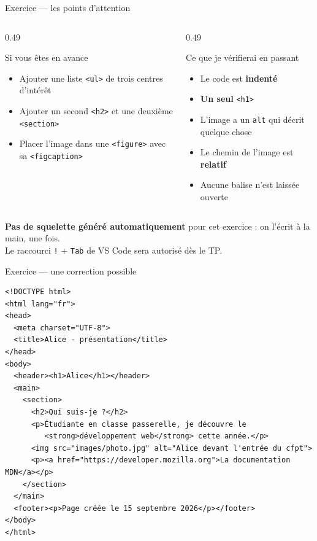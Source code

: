 \documentclass[aspectratio=169,11pt]{beamer}
\begin{document}
\begin{frame}{Exercice --- les points d'attention}
  \begin{columns}[T]
    \begin{column}{0.49\textwidth}
      \begin{exampleblock}{Si vous êtes en avance}
        \begin{itemize}
          \item Ajouter une liste \texttt{<ul>} de trois centres d'intérêt
          \item Ajouter un second \texttt{<h2>} et une deuxième \texttt{<section>}
          \item Placer l'image dans une \texttt{<figure>} avec sa \texttt{<figcaption>}
        \end{itemize}
      \end{exampleblock}
    \end{column}
    \begin{column}{0.49\textwidth}
      \begin{alertblock}{Ce que je vérifierai en passant}
        \begin{itemize}
          \item Le code est \textbf{indenté}
          \item \textbf{Un seul} \texttt{<h1>}
          \item L'image a un \texttt{alt} qui décrit quelque chose
          \item Le chemin de l'image est \textbf{relatif}
          \item Aucune balise n'est laissée ouverte
        \end{itemize}
      \end{alertblock}
    \end{column}
  \end{columns}
  \vspace{0.25cm}
  \begin{center}
    \small \textbf{Pas de squelette généré automatiquement} pour cet exercice : on l'écrit à la main, une fois.\\
    \small Le raccourci \texttt{!} + \texttt{Tab} de VS Code sera autorisé dès le TP.
  \end{center}
\end{frame}

\begin{frame}[fragile]{Exercice --- une correction possible}
\begin{lstlisting}[language=HTML5]
<!DOCTYPE html>
<html lang="fr">
<head>
  <meta charset="UTF-8">
  <title>Alice - présentation</title>
</head>
<body>
  <header><h1>Alice</h1></header>
  <main>
    <section>
      <h2>Qui suis-je ?</h2>
      <p>Étudiante en classe passerelle, je découvre le
         <strong>développement web</strong> cette année.</p>
      <img src="images/photo.jpg" alt="Alice devant l'entrée du cfpt">
      <p><a href="https://developer.mozilla.org">La documentation MDN</a></p>
    </section>
  </main>
  <footer><p>Page créée le 15 septembre 2026</p></footer>
</body>
</html>
\end{lstlisting}
\end{frame}
\end{document}

